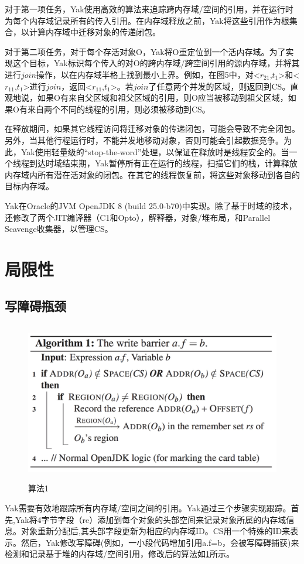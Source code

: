 对于第一项任务，Yak使用高效的算法来追踪跨内存域/空间的引用，并在运行时为每个内存域记录所有的传入引用。在内存域释放之前，Yak将这些引用作为根集合，以计算内存域中迁移对象的传递闭包。

对于第二项任务，对于每个存活对象O，Yak将O重定位到一个活内存域。为了实现这个目标，Yak标识每个传入的对O的跨内存域/跨空间引用的源内存域，并将其进行$join$操作，以在内存域半格上找到最小上界。例如，在图5中，对<$r_{21}$,$t_1$>和<$r_{11}$,$t_1$>进行$join$，返回<$r_{11}$,$t_1$>。若$join$了任意两个并发的区域，则返回到CS。直观地说，如果O有来自父区域和祖父区域的引用，则O应当被移动到祖父区域，如果O有来自两个不同的线程的引用，则必须被移动到CS。

在释放期间，如果其它线程访问将迁移对象的传递闭包，可能会导致不完全闭包。另外，当其他行程运行时，不能并发地移动对象，否则可能会引起数据竞争。为此，Yak使用轻量级的“stop-the-word”处理，以保证在释放时是线程安全的。当一个线程到达时域结束期，Yak暂停所有正在运行的线程，扫描它们的栈，计算释放内存域内所有潜在活对象的闭包。在其它的线程恢复前，将这些对象移动到各自的目标内存域。

Yak在Oracle的JVM OpenJDK 8 (build 25.0-b70)中实现。除了基于时域的技术，还修改了两个JIT编译器（C1和Opto），解释器，对象/堆布局，和Parallel Scavenge收集器，以管理CS。




\section{局限性}


\subsection{写障碍瓶颈}

\begin{figure}[h]
    \centering
    \includegraphics[width=12cm,height=7cm]{figure/algorithm1.jpg}
    \caption{
        算法1
    }
    \label{algorithm1}
\end{figure}
Yak需要有效地跟踪所有内存域/空间之间的引用。Yak通过三个步骤实现跟踪。首先,Yak将4字节字段（re）添加到每个对象的头部空间来记录对象所属的内存域信息。对象重新分配后,其头部字段更新为相应的内存域ID。CS用一个特殊的ID来表示。然后，Yak修改写障碍(例如，一小段代码增加引用a.f=b，会被写障碍捕获)来检测和记录基于堆的内存域/空间引用，修改后的算法如\ref{algorithm1}所示。

